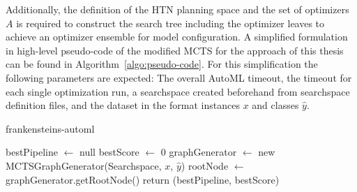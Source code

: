 Additionally, the definition of the HTN planning space and the set of optimizers $A$ is required to construct the search tree including the optimizer leaves to achieve an optimizer ensemble for model configuration.
A simplified formulation in high-level pseudo-code of the modified MCTS for the approach of this thesis can be found in Algorithm~\ref{algo:pseudo-code}.
For this simplification the following parameters are expected: The overall AutoML timeout, the timeout for each single optimization run, a searchspace created beforehand from searchspace definition files, and the dataset in the format instances $x$ and classes $\hat{y}$.
\begin{algorithm}[ht!]
    \caption{frankensteins-automl}
    \label{algo:pseudo-code}
    \SetAlgoLined
    \DontPrintSemicolon
    \BlankLine
    bestPipeline $\leftarrow$ null\;
    bestScore $\leftarrow$ 0\;
    graphGenerator $\leftarrow$ new MCTSGraphGenerator(Searchspace, $x$, $\hat{y}$)\;
    rootNode $\leftarrow$ graphGenerator.getRootNode()\;
    return (bestPipeline, bestScore)\;
\end{algorithm}

